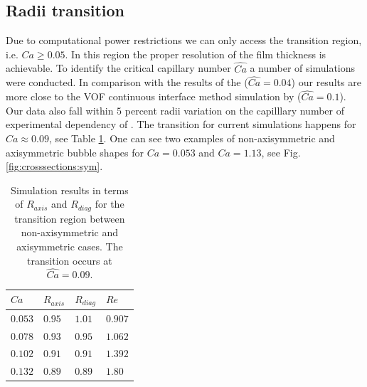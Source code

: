 \documentclass[preprint,12pt]{elsarticle}
\begin{document}
\subsection{Radii transition}
Due to computational power restrictions we can only access the
transition region, i.e. $Ca\geq 0.05$. In this region the proper resolution of the film thickness
is achievable. To identify the critical capillary number $\widehat{Ca}$ a number of simulations
were conducted. In comparison with the results of the \citet{heil-threedim}
($\widehat{Ca}=0.04$) our
results are more close to the VOF continuous interface method simulation by
\citet{wang-non-circular} ($\widehat{Ca}=0.1$). Our data also fall within $5$ percent radii
variation on the
capilllary number of experimental dependency of
\citet{shikazono-square}. The transition for current simulations happens for $Ca\approx 0.09$, see
Table
\ref{table:transition:results}.  One can see
two examples of non-axisymmetric and axisymmetric bubble shapes for $Ca=0.053$ and $Ca=1.13$, see
Fig.
\ref{fig:crosssections:sym}.  
\begin{table}
\begin{tabularx}{\textwidth}{|X|X|X|X|}%
\hline
$Ca$&$R_{axis}$&$R_{diag}$&$Re$\\ %
\hline
$0.053$&$0.95$&$1.01$&$0.907$\\%
$0.078$&$0.93$&$0.95$&$1.062$\\%
$0.102$&$0.91$&$0.91$&$1.392$\\
$0.132$&$0.89$&$0.89$&$1.80$\\%
\hline
\end{tabularx}
\caption{Simulation results in terms of $R_{axis}$ and $R_{diag}$ for the transition region between
non-axisymmetric and axisymmetric cases. The transition occurs at $\widehat{Ca}=0.09$.
\label{table:transition:results}}
\end{table}
\end{document}
